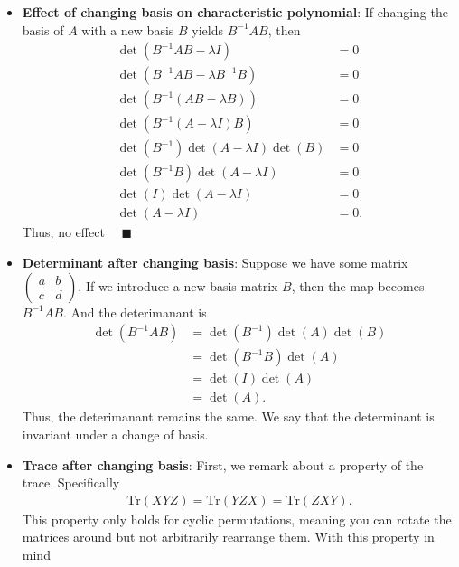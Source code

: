 \documentclass{report}
\begin{document}
\begin{itemize}
        \item \textbf{Effect of changing basis on characteristic polynomial}: If changing the basis of $A$ with a new basis $B$ yields $B^{-1}AB$, then
            \begin{align*}
                \det(B^{-1}AB - \lambda I) &= 0 \\
                \det(B^{-1}AB - \lambda B^{-1}B) &= 0 \\
                \det(B^{-1}(AB - \lambda B)) &= 0 \\
                \det(B^{-1}(A - \lambda I )B) &= 0 \\
                \det(B^{-1})\det(A-\lambda I)\det(B) &=0 \\
                \det(B^{-1}B)\det(A- \lambda I) &= 0 \\
                \det(I)\det(A-\lambda I) &= 0 \\
                \det(A-\lambda I) &=0
            .\end{align*}
            Thus, no effect $\quad \blacksquare$
        \item \textbf{Determinant after changing basis}: Suppose we have some matrix $\begin{pmatrix} a & b \\ c & d\end{pmatrix} $. If we introduce a new basis matrix $B$, then the map becomes $B^{-1}AB$. And the deterimanant is
            \begin{align*}
                \det(B^{-1}AB) &= \det(B^{-1})\det(A)\det(B) \\
                               &= \det(B^{-1}B)\det(A) \\
                               &= \det(I)\det(A) \\
                               &= \det(A)
            .\end{align*}
            Thus, the deterimanant remains the same. We say that the determinant is invariant under a change of basis.
        \item \textbf{Trace after changing basis}: First, we remark about a property of the trace. Specifically
            \begin{align*}
                \text{Tr}(XYZ) = \text{Tr}(YZX) = \text{Tr}(ZXY)
            .\end{align*}
            This property only holds for cyclic permutations, meaning you can rotate the matrices around but not arbitrarily rearrange them.
            \bigbreak \noindent 
            With this property in mind

\end{itemize}
\end{document}
